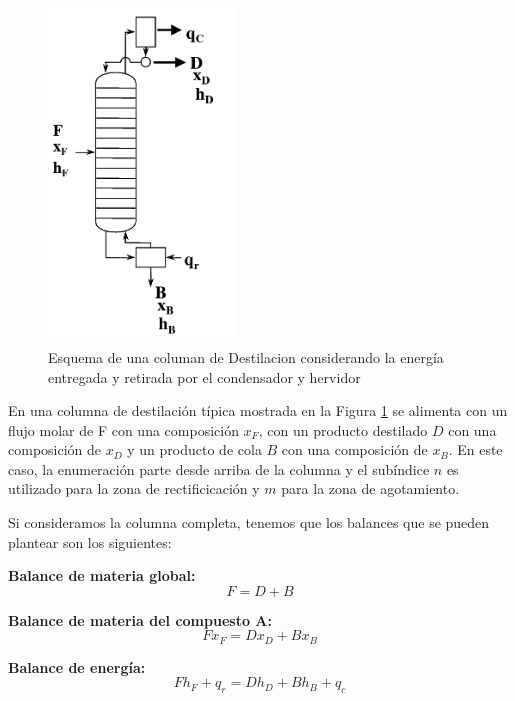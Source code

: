 \documentclass[11pt]{book}
\begin{document}
\begin{figure}
    \centering
    \includegraphics[width=5cm]{img/destilacion/ColumnaDestilacionPonchon.png}
    \caption{Esquema de una columan de Destilacion considerando la energía entregada y retirada por el condensador y hervidor}
    \label{fig:ColumnaDestilacionPonchon}
\end{figure}

En una columna de destilación típica mostrada en la Figura \ref{fig:ColumnaDestilacionPonchon} se alimenta con un flujo molar de F con una composición $x_F$, con un producto destilado $D$ con una composición de $x_D$ y un producto de cola $B$ con una composición de $x_B$. En este caso, la enumeración parte desde arriba de la columna y el subíndice $n$ es utilizado para la zona de rectificicación y $m$ para la zona de agotamiento. 

Si consideramos la columna completa, tenemos que los balances que se pueden plantear son los siguientes:

\textbf{Balance de materia global:}
\begin{equation}
    \label{eq:PonchonSavarit_16}
    F = D + B
\end{equation}

\textbf{Balance de materia del compuesto A:}
\begin{equation}
    \label{eq:PonchonSavarit_17}
    F x_F = D x_D + B x_B
\end{equation}

\textbf{Balance de energía:}
\begin{equation}
    \label{eq:PonchonSavarit_18}
    F h_F + q_r = D h_D + B h_B + q_c
\end{equation}
\end{document}
